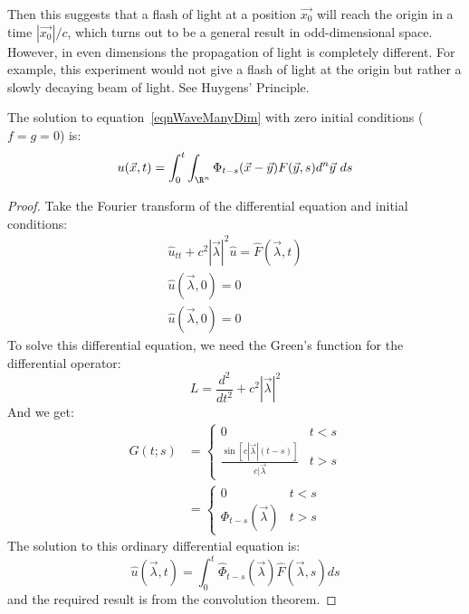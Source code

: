 \documentclass[../Main.tex]{subfiles}
\begin{document}
Then this suggests that a flash of light at a position $\vec{x_0}$ will reach the origin in a time $|\vec{x_0}| / c$, which turns out to be a general result in odd-dimensional space. However, in even dimensions the propagation of light is completely different. For example, this experiment would not give a flash of light at the origin but rather a slowly decaying beam of light. See Huygens' Principle.
\begin{proposition}
    The solution to equation~\ref{eqnWaveManyDim} with zero initial conditions ($f = g = 0$) is:
    \begin{equation*}
        u(\vec{x}, t) = \int_{0}^{t} \int_{\R^n} \Phi_{t - s}(\vec{x} - \vec{y})F(\vec{y}, s)d^n \vec{y}~ds 
    \end{equation*}
    \label{propWaveSolutionZeroInitial}
\end{proposition}
\begin{proof}
    Take the Fourier transform of the differential equation and initial conditions:
    \begin{gather*}
        \hat{u}_{tt} + c^2 |\vec{\lambda}|^2 \hat{u} = \hat{F}(\vec{\lambda}, t) \\
        \hat{u}(\vec{\lambda}, 0) = 0 \\
        \hat{u}(\vec{\lambda}, 0) = 0
    \end{gather*}
    To solve this differential equation, we need the Green's function for the differential operator:
    \begin{equation*}
        L = \frac{d^{2}}{dt^{2}} + c^2 |\vec{\lambda}|^2
    \end{equation*}
    And we get:
    \begin{align*}
        G(t;s) &=
        \begin{cases}
            0 & t<s \\
            \frac{\sin\left[c|\vec{\lambda}|(t - s)\right]}{c|\vec{\lambda}} & t > s
        \end{cases} \\
        &=
        \begin{cases}
            0 & t<s \\
            \Phi_{t - s}(\vec{\lambda}) & t > s
        \end{cases}
    \end{align*}
    The solution to this ordinary differential equation is:
    \begin{equation*}
        \hat{u}(\vec{\lambda}, t) = \int_0^t \hat{\Phi}_{t - s} (\vec{\lambda}) \hat{F}(\vec{\lambda}, s) ds
    \end{equation*}
    and the required result is from the convolution theorem.
\end{proof}
\end{document}
